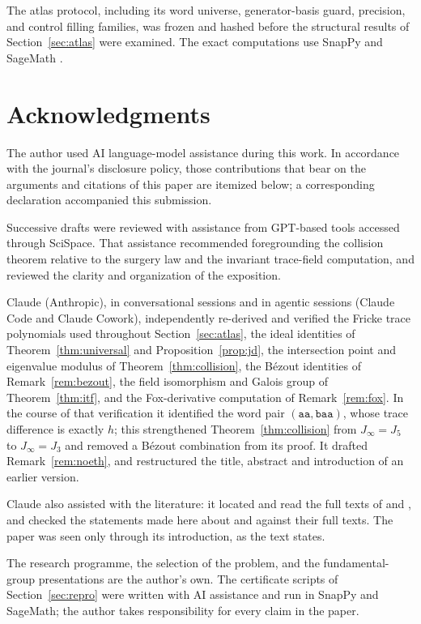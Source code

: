 \documentclass[11pt,a4paper]{article}
\theoremstyle{definition}
\theoremstyle{remark}
\begin{document}
The atlas protocol, including its word universe, generator-basis guard,
precision, and control filling families, was frozen and hashed before
the structural results of Section~\ref{sec:atlas} were examined.
The exact computations use SnapPy \cite{SnapPy} and SageMath \cite{Sage}.

\section*{Acknowledgments}

The author used AI language-model assistance during this work. In
accordance with the journal's disclosure policy, those contributions that
bear on the arguments and citations of this paper are itemized below; a
corresponding declaration accompanied this submission.

Successive drafts were reviewed with assistance from GPT-based tools
accessed through SciSpace. That assistance recommended foregrounding the
collision theorem relative to the surgery law and the invariant
trace-field computation, and reviewed the clarity and organization of the
exposition.

Claude (Anthropic), in conversational sessions and in agentic sessions
(Claude Code and Claude Cowork), independently re-derived and verified
the Fricke trace polynomials used throughout
Section~\ref{sec:atlas}, the ideal identities of
Theorem~\ref{thm:universal} and Proposition~\ref{prop:jd}, the
intersection point and eigenvalue modulus of
Theorem~\ref{thm:collision}, the B\'ezout identities of
Remark~\ref{rem:bezout}, the field isomorphism and Galois group of
Theorem~\ref{thm:itf}, and the Fox-derivative computation of
Remark~\ref{rem:fox}. In the course of that verification it identified
the word pair $(\mathtt{aa},\mathtt{baa})$, whose trace difference is
exactly $h$; this strengthened Theorem~\ref{thm:collision} from
$J_\infty = J_5$ to $J_\infty = J_3$ and removed a B\'ezout combination
from its proof. It drafted Remark~\ref{rem:noeth}, and restructured the
title, abstract and introduction of an earlier version.

Claude also assisted with the literature: it located and read the full
texts of \cite{GinzburgRudnick1998} and \cite{Wang2007}, and checked the
statements made here about \cite{Horowitz1972} and \cite{Southcott1979}
against their full texts. The paper \cite{Thompson1989} was seen only
through its introduction, as the text states.

The research programme, the selection of the problem, and the
fundamental-group presentations are the author's own. The certificate
scripts of Section~\ref{sec:repro} were written with AI assistance and
run in SnapPy and SageMath; the author takes responsibility for every
claim in the paper.
\end{document}
